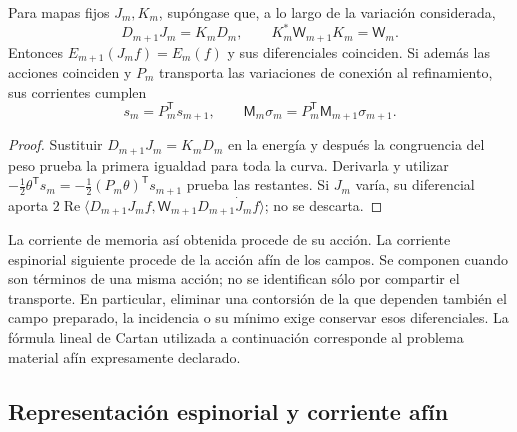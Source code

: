 \begin{proposition}
\label{hmtcuatro:ant:refinamiento-corriente}
Para mapas fijos \(J_m,K_m\), supóngase que, a lo largo de la
variación considerada,
\[
 D_{m+1}J_m=K_mD_m,\qquad
 K_m^*\mathsf W_{m+1}K_m=\mathsf W_m .
\]
Entonces \(E_{m+1}(J_mf)=E_m(f)\) y sus diferenciales coinciden.
Si además las acciones coinciden y \(P_m\) transporta las
variaciones de conexión al refinamiento, sus corrientes cumplen
\[
 s_m=P_m^{\mathsf T}s_{m+1},\qquad
 \mathsf M_m\sigma_m=P_m^{\mathsf T}\mathsf M_{m+1}\sigma_{m+1}.
\]
\end{proposition}
\begin{proof}
Sustituir \(D_{m+1}J_m=K_mD_m\) en la energía y después la
congruencia del peso prueba la primera igualdad para toda la
curva. Derivarla y utilizar
\(-\frac12\theta^{\mathsf T}s_m
=-\frac12(P_m\theta)^{\mathsf T}s_{m+1}\)
prueba las restantes. Si \(J_m\) varía, su diferencial aporta
\(2\operatorname{Re}\langle D_{m+1}J_mf,
\mathsf W_{m+1}D_{m+1}\dot J_m f\rangle\); no se descarta.
\end{proof}

La corriente de memoria así obtenida procede de su acción.
La corriente espinorial siguiente procede de la acción afín de
los campos. Se componen cuando son términos de una misma acción;
no se identifican sólo por compartir el transporte. En particular,
eliminar una contorsión de la que dependen también el campo
preparado, la incidencia o su mínimo exige conservar esos
diferenciales. La fórmula lineal de Cartan utilizada a continuación
corresponde al problema material afín expresamente declarado.

\subsection{Representación espinorial y corriente afín}
\label{hmtcuatro:ant:espinores}

